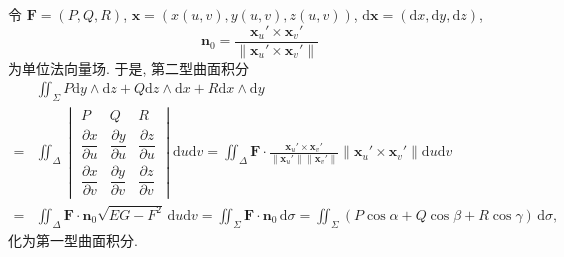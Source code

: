令 $\boldsymbol{F}=(P,Q,R)$, $\boldsymbol{x}=(x(u,v),y(u,v),z(u,v))$, $\mathrm{d}\boldsymbol{x}=(\mathrm{d}x,\mathrm{d}y,\mathrm{d}z)$,
\[
\boldsymbol{n}_{0}=\frac{\boldsymbol{x}_{u}'\times\boldsymbol{x}_{v}'}{\lVert\boldsymbol{x}_{u}'\times\boldsymbol{x}_{v}'\rVert}
\]
为单位法向量场. 于是, 第二型曲面积分
\[
\begin{aligned}
&\iint_{\Sigma}P\mathrm{d}y\wedge\mathrm{d}z+Q\mathrm{d}z\wedge\mathrm{d}x+R\mathrm{d}x\wedge\mathrm{d}y\\
={}&\iint_{\Delta}
\begin{vmatrix}
P&Q&R\\[2pt]
\dfrac{\partial x}{\partial u}&\dfrac{\partial y}{\partial u}&\dfrac{\partial z}{\partial u}\\[4pt]
\dfrac{\partial x}{\partial v}&\dfrac{\partial y}{\partial v}&\dfrac{\partial z}{\partial v}
\end{vmatrix}\mathrm{d}u\mathrm{d}v=\iint_{\Delta}\boldsymbol{F}\cdot\frac{\boldsymbol{x}_{u}'\times\boldsymbol{x}_{v}'}{\lVert\boldsymbol{x}_{u}'\rVert\lVert\boldsymbol{x}_{v}'\rVert}\lVert\boldsymbol{x}_{u}'\times\boldsymbol{x}_{v}'\rVert\mathrm{d}u\mathrm{d}v\\
={}&\iint_{\Delta}\boldsymbol{F}\cdot\boldsymbol{n}_{0}\sqrt{EG-F^{2}}\,\mathrm{d}u\mathrm{d}v=\iint_{\Sigma}\boldsymbol{F}\cdot\boldsymbol{n}_{0}\,\mathrm{d}\sigma=\iint_{\Sigma}(P\cos\alpha+Q\cos\beta+R\cos\gamma)\,\mathrm{d}\sigma,
\end{aligned}
\]
化为第一型曲面积分.

